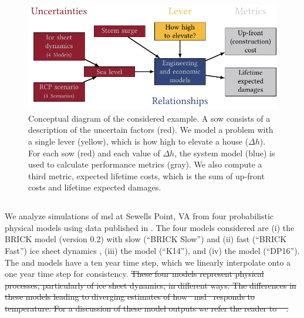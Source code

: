 \documentclass{agujournal2019}
\providecommand{\DIFdel}[1]{{\protect\color{red}\sout{#1}}}                      %
\providecommand{\DIFdelbegin}{} %
\newcommand{\DIFscaledelfig}{0.5}
\newlength{\DIFdelgraphicswidth} %
\newlength{\DIFdelgraphicsheight} %
\newcommand{\DIFdelincludegraphics}[2][]{%
\sbox{\DIFdelgraphicsbox}{\DIFOincludegraphics[#1]{#2}}%
\settoboxwidth{\DIFdelgraphicswidth}{\DIFdelgraphicsbox} %
\settoboxtotalheight{\DIFdelgraphicsheight}{\DIFdelgraphicsbox} %
\scalebox{\DIFscaledelfig}{%
\parbox[b]{\DIFdelgraphicswidth}{\usebox{\DIFdelgraphicsbox}\\[-\baselineskip] \rule{\DIFdelgraphicswidth}{0em}}\llap{\resizebox{\DIFdelgraphicswidth}{\DIFdelgraphicsheight}{%
\setlength{\unitlength}{\DIFdelgraphicswidth}%
\begin{picture}(1,1)%
\thicklines\linethickness{2pt} %
{\color[rgb]{1,0,0}\put(0,0){\framebox(1,1){}}}%
{\color[rgb]{1,0,0}\put(0,0){\line( 1,1){1}}}%
{\color[rgb]{1,0,0}\put(0,1){\line(1,-1){1}}}%
\end{picture}%
}\hspace*{3pt}}} %
} %
\DeclareRobustCommand{\DIFdelbegin}{\DIFOdelbegin \let\includegraphics\DIFdelincludegraphics} %
\begin{document}
\begin{figure}
  \centering
  \includegraphics[width=\textwidth]{xlrm.pdf}
  \caption{
    Conceptual diagram of the considered example.
    A \acrfull{sow} consists of a description of the uncertain factors (red).
    We model a problem with a single lever (yellow), which is how high to elevate a house ($\Delta h$).
    For each \acrshort{sow} (red) and each value of $\Delta h$, the system model (blue) is used to calculate performance metrics (gray).
    We also compute a third metric, expected lifetime costs, which is the sum of up-front costs and lifetime expected damages.
  }\label{fig:xlrm}
\end{figure}

\subsection{}\label{sec:case-slr}

We analyze simulations of \gls{msl} at Sewells Point, VA from four probabilistic physical models using data published in .
The four models considered are (i) the BRICK model (version 0.2) with slow (``BRICK Slow'') and (ii) fast (``BRICK Fast'') ice sheet dynamics \cite{wong_brick0.2:2017}, (iii) the  model (``K14''), and (iv) the  model (``DP16'').
The  and  models have a ten year time step, which we linearly interpolate onto a one year time step for consistency.
\DIFdelbegin \DIFdel{These four models represent physical processes, particularly of ice sheet dynamics, in different ways.
  The differences in these models leading to diverging estimates of how \mbox{%
    \gls{msl} }\hskip0pt%
  responds to temperature.
  For a discussion of these model outputs we refer the reader to \mbox{%
    \citeA{ruckert_coastal:2019}}\hskip0pt%
  .
}%
\end{document}
